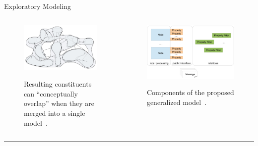\begin{frame}{Exploratory Modeling }
\begin{columns}[t]
\begin{column}{0.2\textwidth}
\vspace{1.5em}
\begin{figure}
{
\includegraphics[width=\linewidth]{exploratory_modeling/merged.jpg}
}

\vspace{-0.5em}
\caption{\scriptsize Resulting constituents can ``conceptually overlap'' when
they are merged into a single model~\cite{Kerdels2012}.}
\end{figure}
\end{column}
\begin{column}{0.34\textwidth}
\begin{figure}
{
\includegraphics[width=\linewidth]{exploratory_modeling/genmodel.jpg}
}

\vspace{-0.75em}
\caption{\scriptsize Components of the proposed generalized model~\cite{Kerdels2012}.}
\end{figure}
\end{column}
\end{columns}	


\begin{center}
\rule{2cm}{0.4pt}\\[0.5em]
\end{center}



\end{frame}


